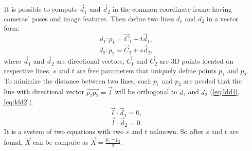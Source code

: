 It is possible to compute $\vec{d}_1$ and $\vec{d}_2$ in the common coordinate frame having cameras' poses and image features.
Then define two lines $d_1$ and $d_2$ in a vector form:
\begin{equation}
    d_1: p_1 = \vec{C}_1 + t \vec{d}_1,
\end{equation}
\begin{equation}
    d_2: p_2 = \vec{C}_2 + s \vec{d}_2,
\end{equation}
where $\vec{d}_1$ and $\vec{d}_2$ are directional vectors, $\vec{C}_1$ and $\vec{C}_2$ are 3D points located on respective lines, $s$ and $t$ are free parameters that uniquely define points $p_1$ and $p_2$. 
To minimize the distance between two lines, such $p_1$ and $p_2$ are needed that the line with directional vector $\vec{p_1p_2} = \vec{l}$ will be orthogonal to $d_1$ and $d_2$ (\autoref{eq:ldd1}, \autoref{eq:ldd2}).
\begin{equation}
    \label{eq:ldd1}
    \vec{l} \cdot \vec{d}_1 = 0,
\end{equation}
\begin{equation}
    \label{eq:ldd2}
    \vec{l} \cdot \vec{d}_2 = 0.
\end{equation}
It is a system of two equations with two $s$ and $t$ unknown.
So after $s$ and $t$ are found, $\vec{X}$ can be compute as $\vec{X} = \frac{p_1 + p_2}{2}$.

